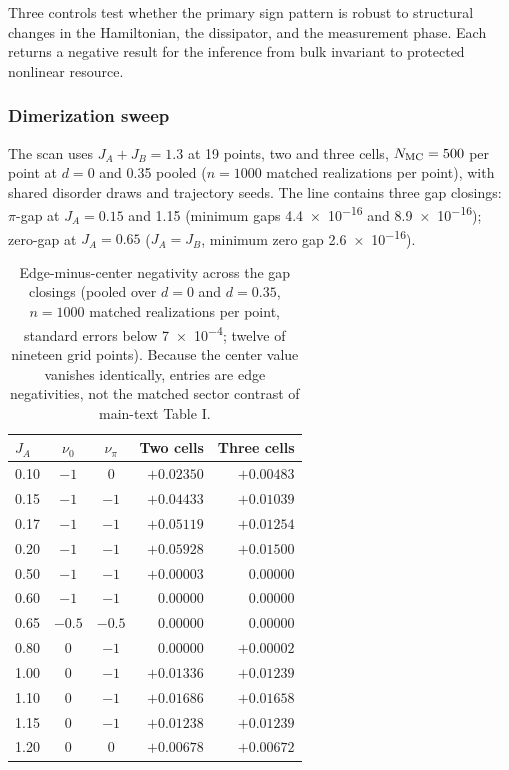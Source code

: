 \documentclass[aps,pra,preprint,superscriptaddress,amsmath,amssymb]{revtex4-2}
\begin{document}
Three controls test whether the primary sign pattern is robust to structural changes in the Hamiltonian, the dissipator, and the measurement phase. Each returns a negative result for the inference from bulk invariant to protected nonlinear resource.

\subsubsection{Dimerization sweep}
\label{sec:dimerization}

The scan uses $J_A+J_B=\num{1.3}$ at \num{19} points, two and three cells, $N_{\rm MC}=\num{500}$ per point at $d=\num{0}$ and \num{0.35} pooled ($n=\num{1000}$ matched realizations per point), with shared disorder draws and trajectory seeds. The line contains three gap closings: $\pi$-gap at $J_A=\num{0.15}$ and \num{1.15} (minimum gaps \num{4.4e-16} and \num{8.9e-16}); zero-gap at $J_A=\num{0.65}$ ($J_A=J_B$, minimum zero gap \num{2.6e-16}).

\begin{table}[h]
\caption{Edge-minus-center negativity across the gap closings (pooled over $d=\num{0}$ and $d=\num{0.35}$, $n=\num{1000}$ matched realizations per point, standard errors below \num{7e-4}; twelve of nineteen grid points). Because the center value vanishes identically, entries are edge negativities, not the matched sector contrast of main-text Table I.}
\label{tab:dimerization}
\begin{ruledtabular}
\begin{tabular}{lccrr}
$J_A$ & $\nu_0$ & $\nu_\pi$ & Two cells & Three cells \\
\hline
\num{0.10} & $-1$ & $0$ & $+\num{0.02350}$ & $+\num{0.00483}$ \\
\num{0.15} & $-1$ & $-1$ & $+\num{0.04433}$ & $+\num{0.01039}$ \\
\num{0.17} & $-1$ & $-1$ & $+\num{0.05119}$ & $+\num{0.01254}$ \\
\num{0.20} & $-1$ & $-1$ & $+\num{0.05928}$ & $+\num{0.01500}$ \\
\num{0.50} & $-1$ & $-1$ & $+\num{0.00003}$ & \num{0.00000} \\
\num{0.60} & $-1$ & $-1$ & \num{0.00000} & \num{0.00000} \\
\num{0.65} & $-0.5$ & $-0.5$ & \num{0.00000} & \num{0.00000} \\
\num{0.80} & $0$ & $-1$ & \num{0.00000} & $+\num{0.00002}$ \\
\num{1.00} & $0$ & $-1$ & $+\num{0.01336}$ & $+\num{0.01239}$ \\
\num{1.10} & $0$ & $-1$ & $+\num{0.01686}$ & $+\num{0.01658}$ \\
\num{1.15} & $0$ & $-1$ & $+\num{0.01238}$ & $+\num{0.01239}$ \\
\num{1.20} & $0$ & $0$ & $+\num{0.00678}$ & $+\num{0.00672}$ \\
\end{tabular}
\end{ruledtabular}
\end{table}
\end{document}
